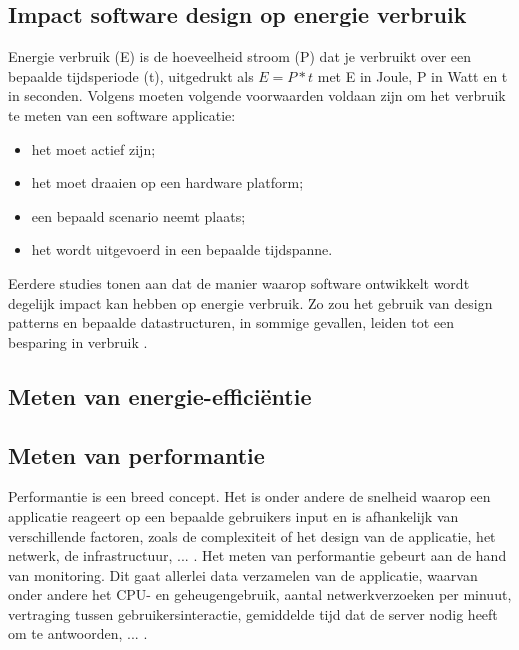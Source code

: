 
\subsection{Impact software design op energie verbruik}
Energie verbruik (E) is de hoeveelheid stroom (P) dat je verbruikt over een bepaalde tijdsperiode (t), uitgedrukt als \(E = P * t\) met E in Joule, P in Watt en t in seconden. Volgens \autocite{GustavoPinto2017} moeten volgende voorwaarden voldaan zijn om het verbruik te meten van een software applicatie:
\begin{itemize}
    \item het moet actief zijn;
    \item het moet draaien op een hardware platform;
    \item een bepaald scenario neemt plaats;
    \item het wordt uitgevoerd in een bepaalde tijdspanne.
\end{itemize}

Eerdere studies tonen aan dat de manier waarop software ontwikkelt wordt degelijk impact kan hebben op energie verbruik. Zo zou het gebruik van design patterns en bepaalde datastructuren, in sommige gevallen, leiden tot een besparing in verbruik \autocite{Georgiou2019}.

\subsection{Meten van energie-efficiëntie}



\subsection{Meten van performantie}
Performantie is een breed concept. Het is onder andere de snelheid waarop een applicatie reageert op een bepaalde gebruikers input \autocite{Miskolczy2023} en is afhankelijk van verschillende factoren, zoals de complexiteit of het design van de applicatie, het netwerk, de infrastructuur, ... \autocite{Allen2024}. Het meten van performantie gebeurt aan de hand van monitoring. Dit gaat allerlei data verzamelen van de applicatie, waarvan onder andere het CPU- en geheugengebruik, aantal netwerkverzoeken per minuut, vertraging tussen gebruikersinteractie, gemiddelde tijd dat de server nodig heeft om te antwoorden, ... \autocite{Kanjilal2022}. 


